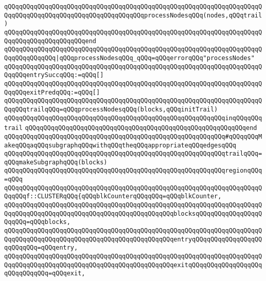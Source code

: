 \verb|qQQqqQQqqQQqqQQqqQQqqQQqqQQqqQQqqQQqqQQqqQQqqQQqqQQqqQQqqQQqqQQqqQQqqQQqqQQqqQQqqQQqqQQqqQQqqQQqqQQqqQQqqQQqprocessNodesqQQq(nodes,qQQqtrail)|\newline
\verb|qQQqqQQqqQQqqQQqqQQqqQQqqQQqqQQqqQQqqQQqqQQqqQQqqQQqqQQqqQQqqQQqqQQqqQQqqQQqqQQqqQQqqQQqqQQqend|\newline
\verb|qQQqqQQqqQQqqQQqqQQqqQQqqQQqqQQqqQQqqQQqqQQqqQQqqQQqqQQqqQQqqQQqqQQqqQQqqQQqqQQqqQQq|\verb#|qQQqprocessNodesqQQq_qQQq=qQQqerrorqQQq"processNodes"#\newline
\newline
\verb|qQQqqQQqqQQqqQQqqQQqqQQqqQQqqQQqqQQqqQQqqQQqqQQqqQQqqQQqqQQqqQQqqQQqqQQqqQQqentrySuccqQQq:=qQQq[]|\newline
\verb|qQQqqQQqqQQqqQQqqQQqqQQqqQQqqQQqqQQqqQQqqQQqqQQqqQQqqQQqqQQqqQQqqQQqqQQqqQQqexitPredqQQq:=qQQq[]|\newline
\verb|qQQqqQQqqQQqqQQqqQQqqQQqqQQqqQQqqQQqqQQqqQQqqQQqqQQqqQQqqQQqqQQqqQQqqQQqqQQqtrailqQQq=qQQqprocessNodesqQQq(blocks,qQQqinitTrail)|\newline
\verb|qQQqqQQqqQQqqQQqqQQqqQQqqQQqqQQqqQQqqQQqqQQqqQQqqQQqqQQqqQQqinqQQqqQQqtrail|\newline
\verb|qQQqqQQqqQQqqQQqqQQqqQQqqQQqqQQqqQQqqQQqqQQqqQQqqQQqqQQqqQQqend|\newline
\newline
\verb|qQQqqQQqqQQqqQQqqQQqqQQqqQQqqQQqqQQqqQQqqQQqqQQqqQQqqQQqqQQq#qQQqqQQqMakeqQQqaqQQqsubgraphqQQqwithqQQqtheqQQqappropriateqQQqedgesqQQq|\newline
\verb|qQQqqQQqqQQqqQQqqQQqqQQqqQQqqQQqqQQqqQQqqQQqqQQqqQQqqQQqqQQqtrailqQQq=qQQqmakeSubgraphqQQq(blocks)|\newline
\newline
\verb|qQQqqQQqqQQqqQQqqQQqqQQqqQQqqQQqqQQqqQQqqQQqqQQqqQQqqQQqqQQqregionqQQq=qQQq|\newline
\verb|qQQqqQQqqQQqqQQqqQQqqQQqqQQqqQQqqQQqqQQqqQQqqQQqqQQqqQQqqQQqqQQqqQQqqQQqqQQqf::CLUSTERqQQq{qQQqblkCounterqQQqqQQq=qQQqblkCounter,|\newline
\verb|qQQqqQQqqQQqqQQqqQQqqQQqqQQqqQQqqQQqqQQqqQQqqQQqqQQqqQQqqQQqqQQqqQQqqQQqqQQqqQQqqQQqqQQqqQQqqQQqqQQqqQQqqQQqqQQqqQQqblocksqQQqqQQqqQQqqQQqqQQqqQQq=qQQqblocks,|\newline
\verb|qQQqqQQqqQQqqQQqqQQqqQQqqQQqqQQqqQQqqQQqqQQqqQQqqQQqqQQqqQQqqQQqqQQqqQQqqQQqqQQqqQQqqQQqqQQqqQQqqQQqqQQqqQQqqQQqqQQqentryqQQqqQQqqQQqqQQqqQQqqQQqqQQq=qQQqentry,|\newline
\verb|qQQqqQQqqQQqqQQqqQQqqQQqqQQqqQQqqQQqqQQqqQQqqQQqqQQqqQQqqQQqqQQqqQQqqQQqqQQqqQQqqQQqqQQqqQQqqQQqqQQqqQQqqQQqqQQqqQQqexitqQQqqQQqqQQqqQQqqQQqqQQqqQQqqQQq=qQQqexit,|\newline
